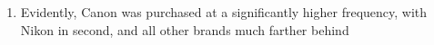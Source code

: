 \documentclass[12pt]{article}
\begin{document}
\begin{enumerate}
\begin{center}
    \end{center}

  \item Evidently, Canon was purchased at a significantly higher frequency, with Nikon in second, and all other brands much farther behind

\end{enumerate}
\end{document}

